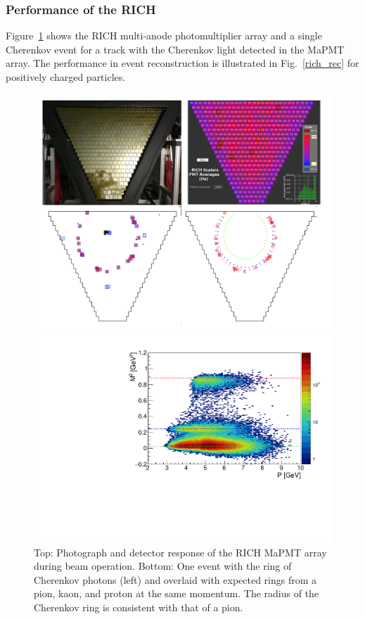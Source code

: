 \documentclass[final,3p,twocolumn]{elsarticle}
\begin{document}
\subsubsection{Performance of the RICH} 

Figure~\ref{rich-event} shows the RICH multi-anode photomultiplier array and a single Cherenkov event for a
track with the Cherenkov light detected in the MaPMT array.  The performance in event reconstruction is
illustrated in Fig.~\ref{rich_rec} for positively charged particles. 

\begin{figure}[t!]
\centerline{\includegraphics[width=1.0\columnwidth]{rich-event.png}}
\caption{Top: Photograph and detector response of the RICH MaPMT array during beam operation. Bottom: One
  event with the ring of Cherenkov photons (left) and overlaid with expected rings from a pion, kaon, and proton
  at the same momentum. The radius of the Cherenkov ring is consistent with that of a pion.}
\label{rich-event}
\vspace{0.3cm}\centerline{\includegraphics[width=1.0\columnwidth]{mass_PID.pdf}}

\end{figure}
\end{document}
